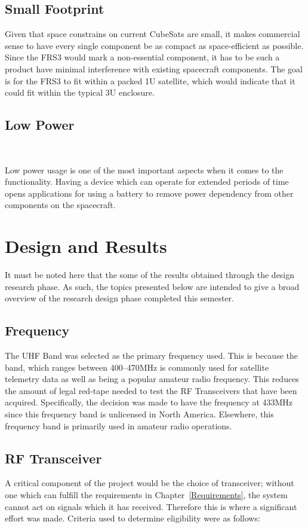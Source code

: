 \documentclass[12pt, twoside]{report}
\begin{document}
\section{Small Footprint}
\par Given that space constrains on current CubeSats are small, it makes commercial sense to have every single component be as compact as space-efficient as possible. Since the FRS3 would mark a non-essential component, it has to be such a product have minimal interference with existing spacecraft components. The goal is for the FRS3 to fit within a packed 1U satellite, which would indicate that it could fit within the typical 3U enclosure.

\section{Low Power}~\label{Low Power}
\par Low power usage is one of the most important aspects when it comes to the functionality. Having a device which can operate for extended periods of time opens applications for using a battery to remove power dependency from other components on the spacecraft.

\chapter{Design and Results}
It must be noted here that the some of the results obtained through the design research phase. As such, the topics presented below are intended to give a broad overview of the research design phase completed this semester.

\section{Frequency}

\par The UHF Band was selected as the primary frequency used. This is because the band, which ranges between 400–470MHz is commonly used for satellite telemetry data as well as being a popular amateur radio frequency. This reduces the amount of legal red-tape needed to test the RF Transceivers that have been acquired. Specifically, the decision was made to have the frequency at 433MHz since this frequency band is unlicensed in North America. Elsewhere, this frequency band is primarily used in amateur radio operations.

\section{RF Transceiver}
\par A critical component of the project would be the choice of transceiver; without one which can fulfill the requirements in Chapter~\ref{Requirements}, the system cannot act on signals which it has received. Therefore this is where a significant effort was made. Criteria used to determine eligibility were as follows:
\end{document}
